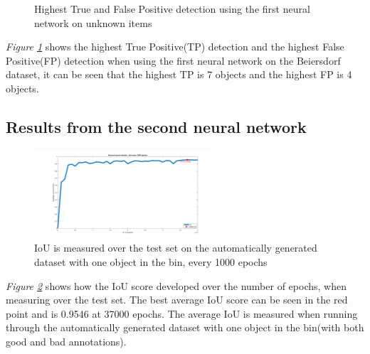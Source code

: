 \begin{figure}[h]
    \centering
    \hfill
    
    \caption{Highest True and False Positive detection using the first neural network on unknown items}
    \label{fig:v1max}
\end{figure}
\textit{Figure \ref{fig:v1max}} shows the highest True Positive(TP) detection and the highest False Positive(FP) detection when using the first neural network on the Beiersdorf dataset, it can be seen that the highest TP is 7 objects and the highest FP is 4 objects.
\clearpage

\subsection{Results from the second neural network}\label{sec:secondneural}

\begin{figure}[h]
    \centering
    \includegraphics[width=0.6\textwidth, trim={5cm 0 4cm 0},clip]{graphics/results/secondneuralnetworkauto.png}
    \caption{IoU is measured over the test set on the automatically generated dataset with one object in the bin, every 1000 epochs}
    \label{fig:v2neuralnetwork}
\end{figure}
\textit{Figure \ref{fig:v2neuralnetwork}} shows how the IoU score developed over the number of epochs, when measuring over the test set. The best average IoU score can be seen in the red point and is 0.9546 at 37000 epochs. The average IoU is measured when running through the automatically generated dataset with one object in the bin(with both good and bad annotations).

